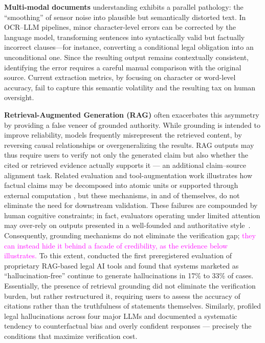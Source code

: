 \documentclass[11pt]{article}
\newcommand{\rev}[1]{\textcolor{magenta}{#1}}
\newcommand{\cfix}[1]{\textcolor{green!50!black}{#1}}
\newcommand{\rev}[1]{#1}
\newcommand{\cfix}[1]{#1}
\begin{document}
\textbf{Multi-modal documents} understanding exhibits a parallel pathology: the ``smoothing'' of sensor noise into plausible but semantically distorted text. In OCR--LLM pipelines, minor character-level errors can be corrected by the language model, transforming sentences into syntactically valid but factually incorrect clauses---for instance, converting a conditional legal obligation into an unconditional one.
Since the resulting output remains contextually consistent, identifying the error requires a careful manual comparison with the original source.
Current extraction metrics, by focusing on character or word-level accuracy, fail to capture this semantic volatility and the resulting tax on human oversight.

\textbf{Retrieval-Augmented Generation (RAG) }often exacerbates this asymmetry by providing a false veneer of grounded authority. While grounding is intended to improve reliability, models frequently misrepresent the retrieved content, by reversing causal relationships or overgeneralizing the results.
\cfix{RAG outputs may thus require users to verify not only the generated claim but also whether the cited or retrieved evidence actually supports it --- an additional claim--source alignment task. Related evaluation and tool-augmentation work illustrates how factual claims may be decomposed into atomic units or supported through external computation \citep{min2023factscore, gao2023pal}, but these mechanisms, in and of themselves, do not eliminate the need for downstream validation.}
These failures are compounded by human cognitive constraints; \cfix{in fact, evaluators operating under limited attention may over-rely on outputs presented in a well-founded and authoritative style~\citep{bansal2021does}.}
Consequently, grounding mechanisms do not eliminate the verification gap;
\rev{they can instead hide it behind a facade of credibility, as the evidence below illustrates.}
To this extent, \cite{magesh2025hallucinationfree} conducted \cfix{the first preregistered evaluation} of proprietary RAG-based legal AI tools and found that systems marketed as ``hallucination-free'' continue to generate hallucinations in 17\% to 33\% of cases.
Essentially, the presence of retrieval grounding did not eliminate the verification burden,
but rather restructured it, requiring users to assess the accuracy of citations rather than the truthfulness of statements themselves.
Similarly, \cite{dahl2024legalfictions} profiled legal hallucinations across four major LLMs and documented a systematic tendency to counterfactual bias and overly confident responses --- precisely the conditions that maximize verification cost.
\end{document}
